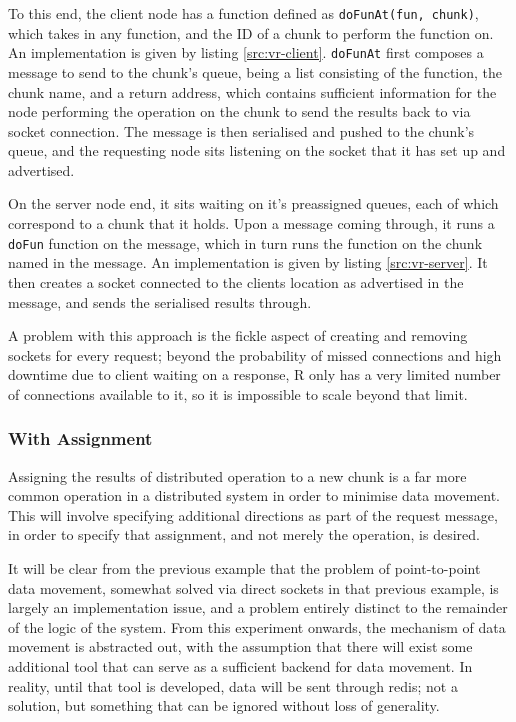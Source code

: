 To this end, the client node has a function defined as \texttt{doFunAt(fun,
chunk)}, which takes in any function, and the ID of a chunk to perform the
function on.
An implementation is given by listing \ref{src:vr-client}.
\texttt{doFunAt} first composes a message to send to the chunk's queue, being a
list consisting of the function, the chunk name, and a return address, which
contains sufficient information for the node performing the operation on the
chunk to send the results back to via socket connection.
The message is then serialised and pushed to the chunk's queue, and the
requesting node sits listening on the socket that it has set up and advertised.

On the server node end, it sits waiting on it's preassigned queues, each of
which correspond to a chunk that it holds. 
Upon a message coming through, it runs a \texttt{doFun} function on the
message, which in turn runs the function on the chunk named in the message. 
An implementation is given by listing \ref{src:vr-server}.
It then creates a socket connected to the clients location as advertised in
the message, and sends the serialised results through.

A problem with this approach is the fickle aspect of creating and removing
sockets for every request; beyond the probability of missed connections and
high downtime due to client waiting on a response, R only has a very limited
number of connections available to it, so it is impossible to scale beyond that
limit.

\subsubsection{With Assignment}

Assigning the results of distributed operation to a new chunk is a far more
common operation in a distributed system in order to minimise data movement.
This will involve specifying additional directions as part of the request
message, in order to specify that assignment, and not merely the operation, is
desired.

It will be clear from the previous example that the problem of point-to-point
data movement, somewhat solved via direct sockets in that previous example, is
largely an implementation issue, and a problem entirely distinct to the
remainder of the logic of the system.
From this experiment onwards, the mechanism of data movement is abstracted out,
with the assumption that there will exist some additional tool that can serve
as a sufficient backend for data movement.
In reality, until that tool is developed, data will be sent through redis; not
a solution, but something that can be ignored without loss of generality.


